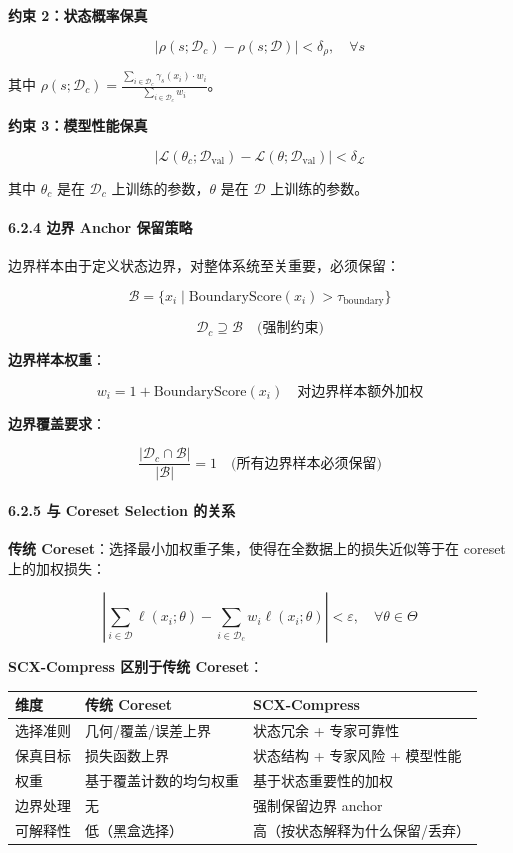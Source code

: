 \documentclass[
  12pt,
]{ctexart}
\begin{document}
\textbf{约束 2：状态概率保真}

\[
\left| \rho(s; \mathcal{D}_c) - \rho(s; \mathcal{D}) \right| < \delta_\rho, \quad \forall s
\]

其中
\(\rho(s; \mathcal{D}_c) = \frac{\sum_{i \in \mathcal{D}_c} \gamma_s(x_i) \cdot w_i}{\sum_{i \in \mathcal{D}_c} w_i}\)。

\textbf{约束 3：模型性能保真}

\[
\left| \mathcal{L}(\theta_c; \mathcal{D}_{\text{val}}) - \mathcal{L}(\theta; \mathcal{D}_{\text{val}}) \right| < \delta_{\mathcal{L}}
\]

其中 \(\theta_c\) 是在 \(\mathcal{D}_c\) 上训练的参数，\(\theta\) 是在
\(\mathcal{D}\) 上训练的参数。

\paragraph{6.2.4 边界 Anchor
保留策略}\label{ux8fb9ux754c-anchor-ux4fddux7559ux7b56ux7565}

边界样本由于定义状态边界，对整体系统至关重要，必须保留：

\[
\mathcal{B} = \{ x_i \mid \text{BoundaryScore}(x_i) > \tau_{\text{boundary}} \}
\]

\[
\mathcal{D}_c \supseteq \mathcal{B} \quad \text{(强制约束)}
\]

\textbf{边界样本权重}：

\[
w_i = 1 + \text{BoundaryScore}(x_i) \quad \text{对边界样本额外加权}
\]

\textbf{边界覆盖要求}：

\[
\frac{|\mathcal{D}_c \cap \mathcal{B}|}{|\mathcal{B}|} = 1 \quad \text{(所有边界样本必须保留)}
\]

\paragraph{6.2.5 与 Coreset Selection
的关系}\label{ux4e0e-coreset-selection-ux7684ux5173ux7cfb}

\textbf{传统
Coreset}：选择最小加权重子集，使得在全数据上的损失近似等于在 coreset
上的加权损失：

\[
\left| \sum_{i \in \mathcal{D}} \ell(x_i; \theta) - \sum_{i \in \mathcal{D}_c} w_i \ell(x_i; \theta) \right| < \varepsilon, \quad \forall \theta \in \Theta
\]

\textbf{SCX-Compress 区别于传统 Coreset}：

\begin{longtable}[]{@{}lll@{}}
\toprule\noalign{}
维度 & 传统 Coreset & SCX-Compress \\
\midrule\noalign{}
\endhead
\bottomrule\noalign{}
\endlastfoot
选择准则 & 几何/覆盖/误差上界 & 状态冗余 + 专家可靠性 \\
保真目标 & 损失函数上界 & 状态结构 + 专家风险 + 模型性能 \\
权重 & 基于覆盖计数的均匀权重 & 基于状态重要性的加权 \\
边界处理 & 无 & 强制保留边界 anchor \\
可解释性 & 低（黑盒选择） & 高（按状态解释为什么保留/丢弃） \\
\end{longtable}
\end{document}
